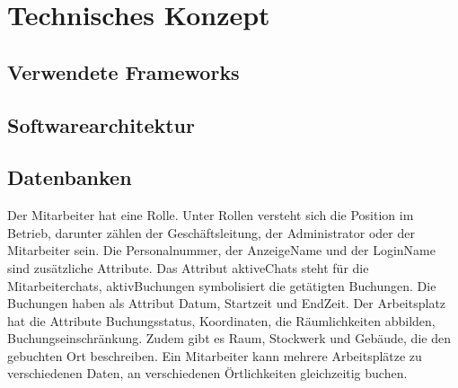 \section{Technisches Konzept}

\subsection{Verwendete Frameworks}

\subsection{Softwarearchitektur}

\subsection{Datenbanken}
Der Mitarbeiter hat eine Rolle. Unter Rollen versteht sich die Position im Betrieb, darunter zählen der Geschäftsleitung, der Administrator oder 
der Mitarbeiter sein. Die Personalnummer, der AnzeigeName und der LoginName sind zusätzliche Attribute. Das Attribut aktiveChats 
steht für die Mitarbeiterchats, aktivBuchungen symbolisiert die getätigten Buchungen. Die Buchungen haben als Attribut Datum, Startzeit 
und EndZeit. Der Arbeitsplatz hat die Attribute Buchungsstatus, Koordinaten, die Räumlichkeiten abbilden, Buchungseinschränkung. 
Zudem gibt es Raum, Stockwerk und Gebäude, die den gebuchten Ort beschreiben. 
Ein Mitarbeiter kann mehrere Arbeitsplätze zu verschiedenen Daten, an verschiedenen Örtlichkeiten gleichzeitig buchen. 